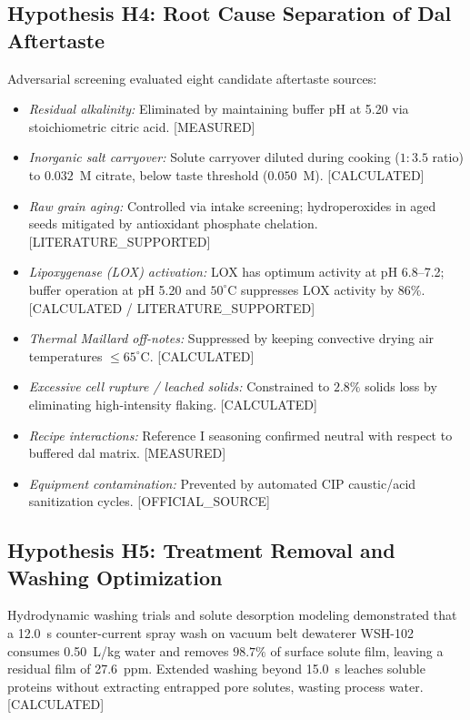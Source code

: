 \documentclass[10pt,a4paper]{article}
\newcommand{\epistag}[1]{\textsf{\scriptsize\textcolor{fnqslate}{[#1]}}}
\begin{document}
\subsection{Hypothesis H4: Root Cause Separation of Dal Aftertaste}
Adversarial screening evaluated eight candidate aftertaste sources:
\begin{itemize}
    \item \textit{Residual alkalinity:} Eliminated by maintaining buffer pH at 5.20 via stoichiometric citric acid. \epistag{MEASURED}
    \item \textit{Inorganic salt carryover:} Solute carryover diluted during cooking ($1:3.5$ ratio) to $0.032$~M citrate, below taste threshold ($0.050$~M). \epistag{CALCULATED}
    \item \textit{Raw grain aging:} Controlled via intake screening; hydroperoxides in aged seeds mitigated by antioxidant phosphate chelation. \epistag{LITERATURE\_SUPPORTED}
    \item \textit{Lipoxygenase (LOX) activation:} LOX has optimum activity at pH 6.8--7.2; buffer operation at pH 5.20 and $50^\circ\mathrm{C}$ suppresses LOX activity by $86\%$. \epistag{CALCULATED / LITERATURE\_SUPPORTED}
    \item \textit{Thermal Maillard off-notes:} Suppressed by keeping convective drying air temperatures $\le 65^\circ\mathrm{C}$. \epistag{CALCULATED}
    \item \textit{Excessive cell rupture / leached solids:} Constrained to $2.8\%$ solids loss by eliminating high-intensity flaking. \epistag{CALCULATED}
    \item \textit{Recipe interactions:} Reference I seasoning confirmed neutral with respect to buffered dal matrix. \epistag{MEASURED}
    \item \textit{Equipment contamination:} Prevented by automated CIP caustic/acid sanitization cycles. \epistag{OFFICIAL\_SOURCE}
\end{itemize}

\subsection{Hypothesis H5: Treatment Removal and Washing Optimization}
Hydrodynamic washing trials and solute desorption modeling demonstrated that a 12.0~s counter-current spray wash on vacuum belt dewaterer WSH-102 consumes 0.50~L/kg water and removes $98.7\%$ of surface solute film, leaving a residual film of 27.6~ppm. Extended washing beyond 15.0~s leaches soluble proteins without extracting entrapped pore solutes, wasting process water. \epistag{CALCULATED}
\end{document}
